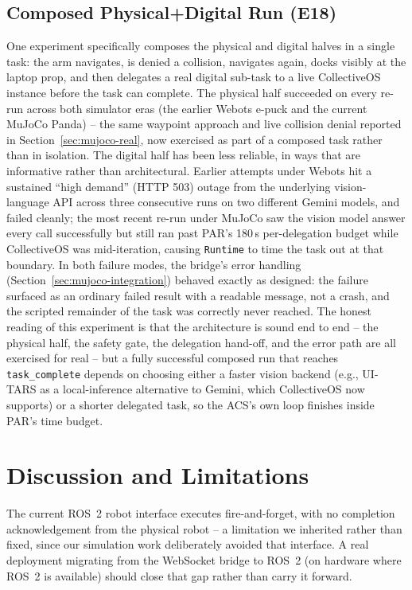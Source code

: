 \documentclass{article}
\begin{document}
\subsection{Composed Physical+Digital Run (E18)}
\label{sec:e18}
One experiment specifically composes the physical and digital halves in a single task: the arm navigates, is denied a collision, navigates again, docks visibly at the laptop prop, and then delegates a real digital sub-task to a live CollectiveOS instance before the task can complete. The physical half succeeded on every re-run across both simulator eras (the earlier Webots e-puck and the current MuJoCo Panda) -- the same waypoint approach and live collision denial reported in Section~\ref{sec:mujoco-real}, now exercised as part of a composed task rather than in isolation. The digital half has been less reliable, in ways that are informative rather than architectural. Earlier attempts under Webots hit a sustained ``high demand'' (HTTP 503) outage from the underlying vision-language API across three consecutive runs on two different Gemini models, and failed cleanly; the most recent re-run under MuJoCo saw the vision model answer every call successfully but still ran past PAR's 180\,s per-delegation budget while CollectiveOS was mid-iteration, causing \texttt{Runtime} to time the task out at that boundary. In both failure modes, the bridge's error handling (Section~\ref{sec:mujoco-integration}) behaved exactly as designed: the failure surfaced as an ordinary failed result with a readable message, not a crash, and the scripted remainder of the task was correctly never reached. The honest reading of this experiment is that the architecture is sound end to end -- the physical half, the safety gate, the delegation hand-off, and the error path are all exercised for real -- but a fully successful composed run that reaches \texttt{task\_complete} depends on choosing either a faster vision backend (e.g., UI-TARS as a local-inference alternative to Gemini, which CollectiveOS now supports) or a shorter delegated task, so the ACS's own loop finishes inside PAR's time budget.


\section{Discussion and Limitations}

The current ROS~2 robot interface executes fire-and-forget, with no completion acknowledgement from the physical robot -- a limitation we inherited rather than fixed, since our simulation work deliberately avoided that interface. A real deployment migrating from the WebSocket bridge to ROS~2 (on hardware where ROS~2 is available) should close that gap rather than carry it forward.
\end{document}
